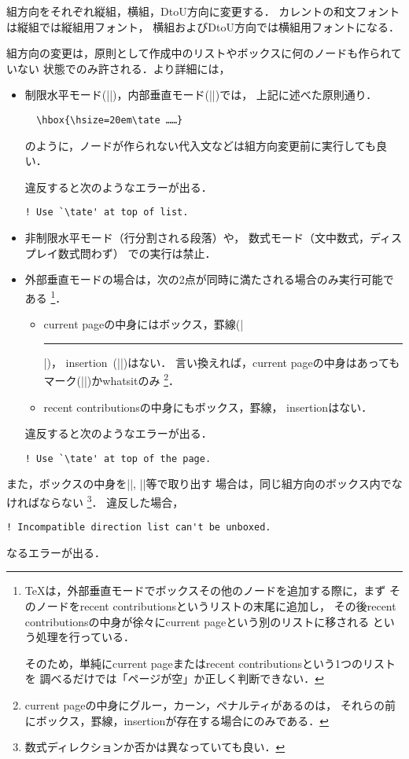 \documentclass[a4paper,11pt,nomag,dvipdfmx]{jsarticle}
\begin{document}
\begin{cslist}
  組方向をそれぞれ縦組，横組，DtoU方向に変更する．
  カレントの和文フォントは縦組では縦組用フォント，
  横組およびDtoU方向では横組用フォントになる．

  組方向の変更は，原則として作成中のリストやボックスに何のノードも作られていない
  状態でのみ許される．より詳細には，
\begin{itemize}
  \item 制限水平モード(|\hbox|)，内部垂直モード(|\vbox|)では，
  上記に述べた原則通り．
\begin{verbatim}
  \hbox{\hsize=20em\tate ……}
\end{verbatim}
  のように，ノードが作られない代入文などは組方向変更前に実行しても良い．

  違反すると次のようなエラーが出る．
\begin{verbatim}
! Use `\tate' at top of list.
\end{verbatim}

  \item 非制限水平モード（行分割される段落）や，
  数式モード（文中数式，ディスプレイ数式問わず）
  での実行は禁止．

  \item 外部垂直モードの場合は，次の2点が同時に満たされる場合のみ実行可能である
    \footnote{%
    \TeX は，外部垂直モードでボックスその他のノードを追加する際に，まず
    そのノードをrecent contributionsというリストの末尾に追加し，
    その後recent contributionsの中身が徐々にcurrent pageという別のリストに移される
    という処理を行っている．

    そのため，単純にcurrent pageまたはrecent contributionsという1つのリストを
    調べるだけでは「ページが空」か正しく判断できない．
    }．
  \begin{itemize}
    \item current pageの中身にはボックス，罫線(|\hrule|)，
      insertion~(|\insert|)はない．
      言い換えれば，current pageの中身はあっても
      マーク(|\mark|)かwhatsitのみ
      \footnote{current pageの中身にグルー，カーン，ペナルティがあるのは，
      それらの前にボックス，罫線，insertionが存在する場合にのみである．}．
    \item recent contributionsの中身にもボックス，罫線，
      insertionはない．
  \end{itemize}
  違反すると次のようなエラーが出る．
\begin{verbatim}
! Use `\tate' at top of the page.
\end{verbatim}

\end{itemize}

  また，ボックスの中身を|\unhbox|, |\unvbox|等で取り出す
  場合は，同じ組方向のボックス内でなければならない
  \footnote{数式ディレクションか否かは異なっていても良い．}．
  違反した場合，
\begin{verbatim}
! Incompatible direction list can't be unboxed.
\end{verbatim}
  なるエラーが出る．
\end{cslist}
\end{document}
